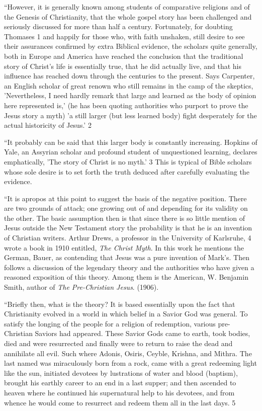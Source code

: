 ``However, it is generally known among students of comparative religions and of the Genesis
of Christianity, that the whole gospel story has been challenged and seriously discussed for
more than half a century. Fortunately, for doubting Thomases 1 and happily for those who,
with faith unshaken, still desire to see their assurances confirmed by extra Biblical evidence,
the scholars quite generally, both in Europe and America have reached the conclusion that
the traditional story of Christ's life is essentially true, that he did actually live, and that his
influence has reached down through the centuries to the present. Says Carpenter, an English
scholar of great renown who still remains in the camp of the skeptics, 'Nevertheless, I need
hardly remark that large and learned as the body of opinion here represented is,' (he has been
quoting authorities who purport to prove the Jesus story a myth) 'a still larger (but less
learned body) fight desperately for the actual historicity of Jesus.' 2

``It probably can be said that this larger body is constantly increasing. Hopkins of Yale, an
Assyrian scholar and profound student of unquestioned learning, declares emphatically, 'The
story of Christ is no myth.' 3 This is typical of Bible scholars whose sole desire is to set forth
the truth deduced after carefully evaluating the evidence.

``It is apropos at this point to suggest the basis of the negative position. There are two
grounds of attack; one growing out of and depending for its validity on the other. The basic
assumption then is that since there is so little mention of Jesus outside the New Testament
story the probability is that he is an invention of Christian writers. Arthur Drews, a professor
in the University of Karlsruhe, 4 wrote a book in 1910 entitled, \textit{The Christ Myth}. In this work
he mentions the German, Bauer, as contending that Jesus was a pure invention of Mark's.
Then follows a discussion of the legendary theory and the authorities who have given a
reasoned exposition of this theory. Among them is the American, W. Benjamin Smith, author
of \textit{The Pre-Christian Jesus}. (1906).

``Briefly then, what is the theory? It is based essentially upon the fact that Christianity
evolved in a world in which belief in a Savior God was general. To satisfy the longing of the
people for a religion of redemption, various pre-Christian Saviors had appeared. These
Savior Gods came to earth, took bodies, died and were resurrected and finally were to return
to raise the dead and annihilate all evil. Such where Adonis, Osiris, Ceyble, Krishna, and
Mithra. The last named was miraculously born from a rock, came with a great redeeming
light like the sun, initiated devotees by lustrations of water and blood (baptism), brought his
earthly career to an end in a last supper; and then ascended to heaven where he continued his
supernatural help to his devotees, and from whence he would come to resurrect and redeem
them all in the last days. 5

